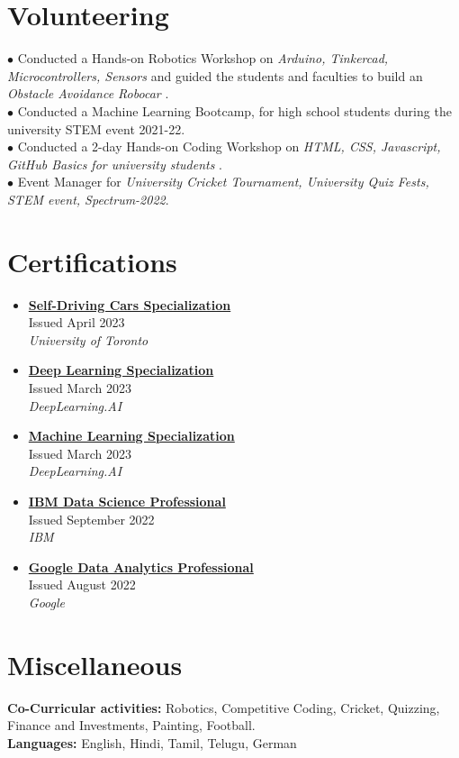 \documentclass[a4paper,11pt]{article}
\newcommand{\resumeLeadership}[3]{
  \item
      \textbf{#1}\\#2 \\
      \textit{\small#3}\\

}
\begin{document}
\vspace{-3.5mm}
\section{Volunteering}


\small{
{$\bullet$ Conducted a Hands-on Robotics Workshop on \textit{Arduino, Tinkercad, Microcontrollers, Sensors} and guided the students and faculties to build an \textit{Obstacle Avoidance Robocar} .}\\
{$\bullet$ Conducted a Machine Learning Bootcamp, for high school students during the university STEM event 2021-22.}\\
{$\bullet$ Conducted a 2-day Hands-on Coding Workshop on \textit{HTML, CSS, Javascript, GitHub Basics for university students} .}\\
{$\bullet$ Event Manager for \textit{University Cricket Tournament, University Quiz Fests, STEM event, Spectrum-2022}.}\\
}

\vspace{-2.5mm}

\section{Certifications}

\vspace{-15pt}
\begin{multicols}{3}
	\begin{itemize}
        \resumeLeadership{\href{https://drive.google.com/file/d/1Ie8h6SQCB01rqpMTPAhcZeSxWbhWZ_kK/view?usp=sharing}{Self-Driving Cars Specialization}}{Issued April 2023}{University of Toronto}    \resumeLeadership{\href{https://drive.google.com/file/d/1ntkqytBIRZEXqgHdYQNZMGp1nE3WO55d/view?usp=sharing}{Deep Learning Specialization}}{Issued March 2023}{DeepLearning.AI} \resumeLeadership{\href{https://drive.google.com/file/d/1YZUAKlISMpajxgVp9BG4QAlyjjT0asmS/view?usp=sharing}{Machine Learning Specialization}}{Issued March 2023}{DeepLearning.AI}	\resumeLeadership{\href{https://drive.google.com/file/d/1SjB08sBkOdnVYhFSPnfVwaZvxJDHKTAR/view?usp=sharing}{IBM Data Science Professional}}{Issued September 2022}{IBM} \resumeLeadership{\href{https://drive.google.com/file/d/190uxeWvmM_IX0r2WzYTZ6nSd4hX1L9VZ/view?usp=sharing}{Google Data Analytics Professional}}{Issued August 2022}{Google}
	\end{itemize}
\end{multicols}

\section{Miscellaneous}

\small{
	\textbf{Co-Curricular activities: }{Robotics, Competitive Coding, Cricket, Quizzing, Finance and Investments, Painting, Football. }\\
    \textbf{Languages: }{English, Hindi, Tamil, Telugu, German}\\
}
\end{document}
